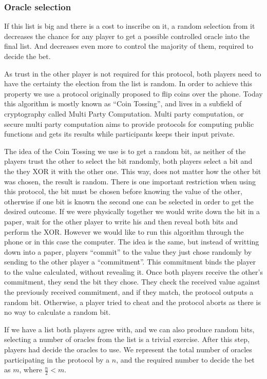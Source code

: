 \subsubsection{Oracle selection}

If this list is big and there is a cost to inscribe on it, a random selection
  from it decreases the chance for any player to get a possible controlled
  oracle into the final list.
And decreases even more to control the majority of them, required to decide
  the bet.

As trust in the other player is not required for this protocol, both players
need to have the certainty the election from the list is random.
In order to achieve this property we use a protocol originally proposed to flip
  coins over the phone\cite{blum1983coin}.
Today this algorithm is mostly known as ``Coin Tossing'', and lives in a
  subfield of cryptography called Multi Party Computation.
Multi party computation, or secure multi party computation aims to provide
  protocols for computing public functions and gets its results while
  participants keeps their input private.

The idea of the Coin Tossing we use is to get a random bit, as neither of the
  players trust the other to select the bit randomly, both players select a bit
  and the they XOR it with the other one.
This way, does not matter how the other bit was chosen, the result is random.
There is one important restriction when using this protocol, the bit must be
  chosen before knowing the value of  the other, otherwise if one bit is known
  the second one can be selected in order to get the desired outcome.
If we were physically together we would write down the bit in a paper, wait for
  the other player to write his and then reveal both bits and perform the XOR.
However we would like to run this algorithm through the phone or in this case
  the computer.
The idea is the same, but instead of writting down into a paper, players
  ``commit'' to the value they just chose randomly by sending to the other
  player a ``commitment''.
This commitment binds the player to the value calculated, without revealing it.
Once both players receive the other's commitment, they send the bit they chose.
They check the received value against the previously received commitment, and if
  they match, the protocol outputs a random bit.
Otherwise, a player tried to cheat and the protocol aborts as there is no way to
  calculate a random bit.

If we have a list both players agree with, and we can also produce random bits,
  selecting a number of oracles from the list is a trivial exercise.
After this step, players had decide the oracles to use.
We represent the total number of oracles participating in the protocol by a $n$,
  and the required number to decide the bet as $m$, where $\frac{n}{2} < m$.
